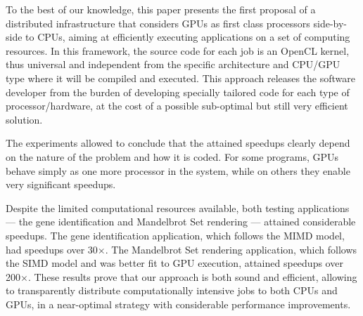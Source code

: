 \documentclass[runningheads,a4paper]{llncs}
\begin{document}


To the best of our knowledge, this paper presents the first proposal of a distributed infrastructure that considers GPUs as first class processors side-by-side to CPUs, aiming at efficiently executing applications on a set of computing resources.
%
In this framework, the source code for each job is an OpenCL kernel, thus universal and independent from the specific architecture and CPU/GPU type where it will be compiled and executed.  This approach releases the software developer from the burden of developing specially tailored code for each type of processor/hardware, at the cost of a possible sub-optimal but still very efficient solution. 

The experiments allowed to conclude that the attained speedups clearly depend on the nature of the problem and how it is coded. For some programs, GPUs behave simply as one more processor in the system, while on others they enable very significant speedups. 

Despite the limited computational resources available, both testing applications --- the gene identification and Mandelbrot Set rendering --- attained considerable speedups. The gene identification application, which follows the MIMD model, had speedups over 30$\times$.  The Mandelbrot Set rendering application, which follows the SIMD model and was better fit to GPU execution, attained speedups over 200$\times$.  These results prove that our approach is both sound and efficient, allowing to transparently distribute computationally intensive jobs to both CPUs and GPUs, in a near-optimal strategy  with considerable performance improvements.
\end{document}
